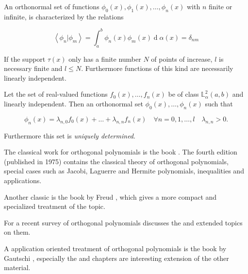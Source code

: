 \documentclass[preview, multi={definition, remark, theorem, proposition, example, literature}, border=0.2in]{standalone}
\DeclareMathOperator{\diff}{d}
\newcommand{\innerp}[2]{\left\langle #1 \vert #2 \right\rangle}
\begin{document}
\begin{definition}[label=18x0c7vo, name=Orthogonal Polynomials]
	An orthonormal set of functions \( \phi_0(x), \phi_1(x), \dots,
	\phi_n(x) \) with \( n \) finite or infinite, is characterized by the
	relations

	\[
		\innerp{\phi_n}{\phi_m} =
		\int_a^b\phi_n(x)\phi_m(x)\diff\alpha(x) = \delta_{nm}
	\]

	If the support \( \tau(x) \) only has a finite number \( N \) of points
	of increase, \( l \) is necessary finite and \( l \leq N \). Furthermore
	functions of this kind are necessarily linearly independent.

	\begin{theorem}[label=g__9ue2i, name=Reparametrization]
		Let the set of real-valued functions \( f_0(x), \dots, f_n(x) \)
		be of class \( \mathbb{L}_\alpha^2(a,b) \) and linearly
		independent. Then an orthonormal set \( \phi_0(x), \dots,
		\phi_n(x)\) such that 

		\[
			\phi_n(x) = \lambda_{n,0}f_0(x) + \dots +
			\lambda_{n,n}f_n(x)\quad\forall
			n=0,1,\dots,l\quad\lambda_{n,n} > 0.
		\]

		Furthermore this set is \emph{uniquely determined}.
	\end{theorem}

	\begin{literature}[label=ckyn0xr9, name=Classical]
		The classical work for orthogonal polynomials is the book
		\cite{szeg1939orthogonal}. The fourth edition (published in
		1975) contains the classical theory of orthogonal polynomials,
		special cases such as Jacobi, Laguerre and Hermite polynomials,
		inequalities and applications.

		Another classic is the book by Freud \cite{freud2014orthogonal},
		which gives a more compact and specialized treatment of the
		topic.

		For a recent survey of orthogonal polynomials
		\cite{totik2005orthogonal} discusses the \cite[origin][search=Some questions leading to]{totik2005orthogonal} and
		extended topics on them.

		A application oriented treatment of orthogonal polynomials is
		the book by Gautschi \cite{gautschi2004orthogonal}, especially
		the \cite[computational methods][search=2 Computational Methods]{gautschi2004orthogonal} and \cite[application][search=3 Applications]{gautschi2004orthogonal} 
		chapters are interesting extension of the other material.
	\end{literature}
	

\end{definition}
\end{document}

